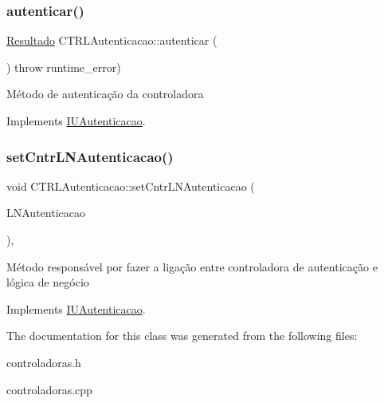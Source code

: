 \subsubsection{\texorpdfstring{autenticar()}{autenticar()}}
{\footnotesize\ttfamily \hyperlink{classResultado}{Resultado} C\+T\+R\+L\+Autenticacao\+::autenticar (\begin{DoxyParamCaption}{ }\end{DoxyParamCaption}) throw  runtime\+\_\+error) \hspace{0.3cm}{\ttfamily [virtual]}}

Método de autenticação da controladora 

Implements \hyperlink{classIUAutenticacao}{I\+U\+Autenticacao}.

\mbox{\label{classCTRLAutenticacao_aa81983ebd30b5ec21e49670034ebd2b9}} 
\subsubsection{\texorpdfstring{set\+Cntr\+L\+N\+Autenticacao()}{setCntrLNAutenticacao()}}
{\footnotesize\ttfamily void C\+T\+R\+L\+Autenticacao\+::set\+Cntr\+L\+N\+Autenticacao (\begin{DoxyParamCaption}\item[{\hyperlink{classILNAutenticacao}{I\+L\+N\+Autenticacao} $\ast$}]{L\+N\+Autenticacao }\end{DoxyParamCaption})\hspace{0.3cm}{\ttfamily [inline]}, {\ttfamily [virtual]}}

Método responsável por fazer a ligação entre controladora de autenticação e lógica de negócio 

Implements \hyperlink{classIUAutenticacao}{I\+U\+Autenticacao}.



The documentation for this class was generated from the following files\+:\begin{DoxyCompactItemize}
\item 
controladoras.\+h\item 
controladoras.\+cpp\end{DoxyCompactItemize}
